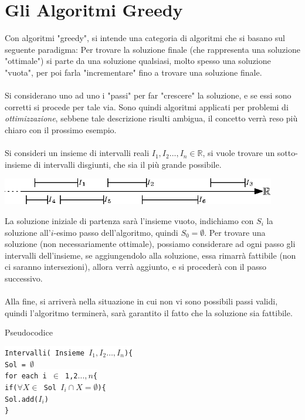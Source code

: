 \documentclass[12pt, letterpaper]{article}
\newcommand{\codee}[1]{\colorbox{white}{\texttt{#1}}}
\newcommand{\acc}{\\\hphantom{}\\}
\begin{document}
\section{Gli Algoritmi Greedy}
Con algoritmi "greedy", si intende una categoria di algoritmi che si basano sul seguente paradigma: Per trovare la soluzione 
finale (che rappresenta una soluzione "ottimale") si parte da una soluzione qualsiasi, molto spesso una soluzione "vuota", per 
poi farla "incrementare" fino a trovare una soluzione finale.\acc 
Si considerano uno ad uno i "passi" per far "crescere" la soluzione, e se essi sono corretti si procede per tale via. Sono quindi algoritmi applicati 
per problemi di \textit{ottimizzazione}, sebbene 
tale descrizione risulti ambigua, il concetto verrà reso più chiaro con il prossimo esempio.\acc 
Si consideri un insieme di intervalli reali $I_1,I_2\dots,I_n \in \mathbb{R}$, si vuole trovare un sotto-insieme di intervalli 
disgiunti, che sia il più grande possibile. \begin{center}
    \includegraphics[width=0.9\textwidth ]{images/intervallIReali.eps}
\end{center}
La soluzione iniziale di partenza sarà l'insieme vuoto, indichiamo con $S_i$ la soluzione all'$i$-esimo passo dell'algoritmo, 
quindi $S_0=\emptyset$. Per trovare una soluzione (non necessariamente ottimale), possiamo considerare ad ogni passo gli intervalli dell'insieme, 
se aggiungendolo alla soluzione, essa rimarrà fattibile (non ci saranno intersezioni), allora verrà aggiunto, e si procederà 
con il passo successivo.\acc 
Alla fine, si arriverà nella situazione in cui non vi sono possibili passi validi, quindi l'algoritmo terminerà, sarà garantito 
il fatto che la soluzione sia fattibile.\begin{center}
    Pseudocodice
\end{center}
\codee{Intervalli( Insieme $I_1,I_2\dots,I_n$)\{}\\
\hphantom{ident}\codee{Sol = $\emptyset$}\\
\hphantom{ident}\codee{for each i $\in$ 1,2$\dots,n$\{}\\
\hphantom{ident}\hphantom{ident}\codee{if($\forall X \in $ Sol $I_i\cap X =\emptyset$)\{}\\
\hphantom{ident}\hphantom{ident}\hphantom{ident}\codee{Sol.add($I_i$)}\\
\hphantom{ident}\hphantom{ident}\codee{\}}\\
\end{document}

